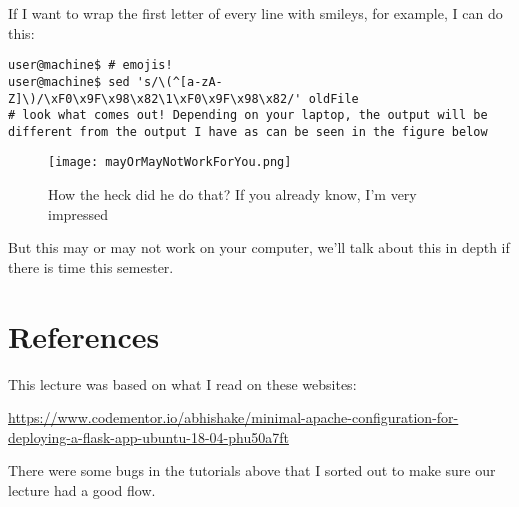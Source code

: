 \documentclass[10pt]{article}
\begin{document}
If I want to wrap the first letter of every line with smileys, for example, I can do this:

\begin{lstlisting}[style=term]
user@machine$ # emojis!
user@machine$ sed 's/\(^[a-zA-Z]\)/\xF0\x9F\x98\x82\1\xF0\x9F\x98\x82/' oldFile
# look what comes out! Depending on your laptop, the output will be different from the output I have as can be seen in the figure below
\end{lstlisting}


\begin{figure}[h]
  \centering
    \texttt{[image: mayOrMayNotWorkForYou.png]}
  \caption{How the heck did he do that? If you already know, I'm very impressed}
\end{figure}

But this may or may not work on your computer, we'll talk about this in depth if there is time this semester.

\section{References}
This lecture was based on what I read  on these websites:

\url{https://www.codementor.io/abhishake/minimal-apache-configuration-for-deploying-a-flask-app-ubuntu-18-04-phu50a7ft}


There were some bugs in the tutorials above that I sorted out to make sure our lecture had a good flow.
\end{document}
